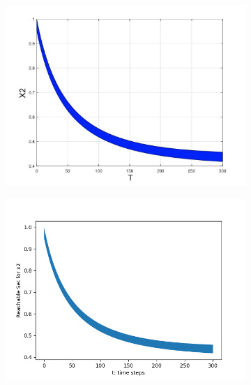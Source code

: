 \documentclass[EPiC]{easychair}
\begin{document}
\begin{figure}[h]
     \hspace{-12ex}
    \begin{subfigure}{0.6\textwidth}
    \centering
    \includegraphics[width=1.2\textwidth]{SapoFigures/LV/SapoLV_X2.jpg}
    \end{subfigure}
    \begin{subfigure}{0.6\textwidth}
    \centering
    \includegraphics[width=1.14\textwidth]{SapoFigures/LV/KaaLV_X2.png}
    \end{subfigure}
    

\end{figure}
\end{document}
